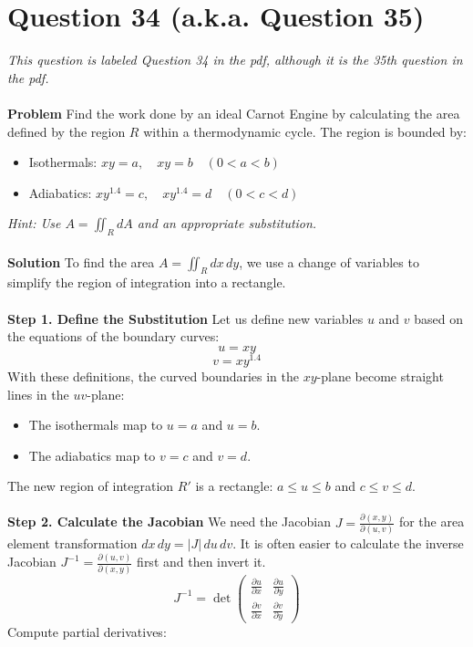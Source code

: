 \documentclass{article}
\begin{document}
\section{Question 34 (a.k.a. Question 35)}
\textit{\small{This question is labeled Question 34 in the pdf, although it is
		the 35th question in the pdf.}}
\\
\\
\textbf{Problem}
Find the work done by an ideal Carnot Engine by calculating the area defined by
the region $R$ within a thermodynamic cycle. The region is bounded by:
\begin{itemize}
	\item Isothermals: $xy = a, \quad xy = b \quad (0 < a < b)$
	\item Adiabatics: $xy^{1.4} = c, \quad xy^{1.4} = d \quad (0 < c < d)$
\end{itemize}
\textit{Hint: Use $A = \iint_R dA$ and an appropriate substitution.}
\\
\\
\textbf{Solution}
To find the area $A = \iint_R dx \, dy$, we use a change of variables to
simplify the region of integration into a rectangle.
\\
\\
\textbf{Step 1. Define the Substitution}
Let us define new variables $u$ and $v$ based on the equations of the boundary
curves:
\[ u = xy \]
\[ v = xy^{1.4} \]
With these definitions, the curved boundaries in the $xy$-plane become straight
lines in the $uv$-plane:
\begin{itemize}
	\item The isothermals map to $u=a$ and $u=b$.
	\item The adiabatics map to $v=c$ and $v=d$.
\end{itemize}
The new region of integration $R'$ is a rectangle: $a \le u \le b$ and
$c \le v \le d$.
\\
\\
\textbf{Step 2. Calculate the Jacobian}
We need the Jacobian $J = \frac{\partial(x,y)}{\partial(u,v)}$ for the area
element transformation $dx \, dy = |J| \, du \, dv$. It is often easier to
calculate the inverse Jacobian $J^{-1} = \frac{\partial(u,v)}{\partial(x,y)}$
first and then invert it.
\[
	J^{-1} = \det \begin{pmatrix} \frac{\partial u}{\partial x} & \frac{\partial u}{\partial y} \\ \frac{\partial v}{\partial x} & \frac{\partial v}{\partial y} \end{pmatrix}
\]
Compute partial derivatives:
\end{document}
